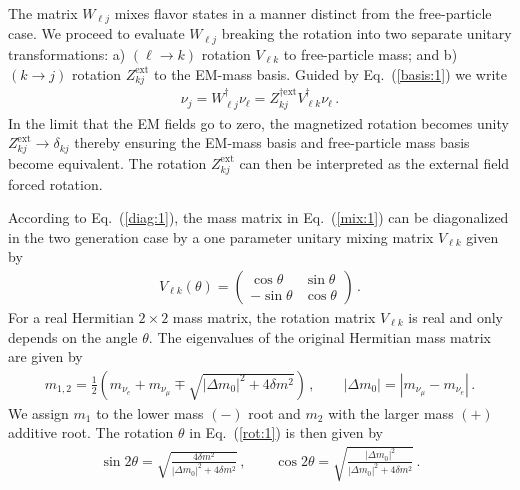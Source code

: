 \documentclass[addchapnum]{ws-rv961x669} %
\newcommand{\req}[1]{Eq.~(\ref{#1})}
\begin{document}
The matrix $W_{\ell j}$ mixes flavor states in a manner distinct from the free-particle case. We proceed to evaluate $W_{\ell j}$ breaking the rotation into two separate unitary transformations: a) $(\ell\rightarrow k)$ rotation $V_{\ell k}$ to free-particle mass; and b) $(k\rightarrow j)$ rotation $Z_{kj}^\mathrm{ext}$ to the EM-mass basis. Guided by \req{basis:1} we write
\begin{align}
\label{zrot:1}
\nu_{j} = W^{\dag}_{\ell j}\nu_{\ell} = Z_{kj}^{\dag\mathrm{ext}}V_{\ell k}^{\dag}\nu_{\ell}\,.
\end{align}
In the limit that the EM fields go to zero, the magnetized rotation becomes unity $Z_{kj}^\mathrm{ext}\rightarrow\delta_{kj}$ thereby ensuring the EM-mass basis and free-particle mass basis become equivalent. The rotation $Z_{kj}^\mathrm{ext}$ can then be interpreted as the external field forced rotation.

According to \req{diag:1}, the mass matrix in \req{mix:1} can be diagonalized in the two generation case by a one parameter unitary mixing matrix $V_{\ell k}$ given by
\begin{align}
\label{rot:1}
V_{\ell k}(\theta)=
\begin{pmatrix}
\cos\theta & \sin\theta\\
-\sin\theta & \cos\theta
\end{pmatrix}\,.
\end{align}
For a real Hermitian $2\times 2$ mass matrix, the rotation matrix $V_{\ell k}$ is real and only depends on the angle $\theta$. The eigenvalues of the original Hermitian mass matrix are given by
\begin{align}
\label{massroot:1}
m_{1,2}=\frac{1}{2}\left(m_{\nu_{e}}+m_{\nu_{\mu}}\mp\sqrt{|\Delta m_{0}|^{2}+4\delta m^{2}}\right)\,,\qquad
|\Delta m_{0}|=|m_{\nu_{\mu}}-m_{\nu_{e}}|\,.
\end{align}
We assign $m_{1}$ to the lower mass $(-)$ root and $m_{2}$ with the larger mass $(+)$ additive root. The rotation $\theta$ in \req{rot:1} is then given by
\begin{align}
\label{massroot:2}
\sin2\theta=\sqrt{\frac{4\delta m^{2}}{|\Delta m_{0}|^{2}+4\delta m^{2}}}\,,\qquad
\cos2\theta=\sqrt{\frac{|\Delta m_{0}|^{2}}{|\Delta m_{0}|^{2}+4\delta m^{2}}}\,.
\end{align}
\end{document}

